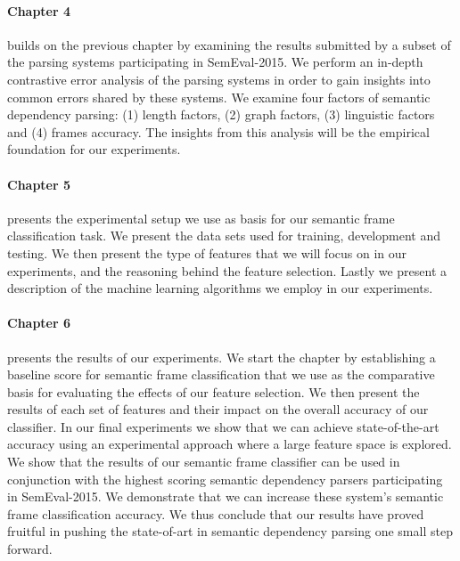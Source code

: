 \paragraph{Chapter 4} builds on the previous chapter by examining the results submitted by a subset of the parsing systems participating in SemEval-2015. We perform an in-depth contrastive error analysis of the parsing systems in order to gain insights into common errors shared by these systems. We examine four factors of semantic dependency parsing: (1) length factors, (2) graph factors, (3) linguistic factors and (4) frames accuracy. The insights from this analysis will be the empirical foundation for our experiments.

\paragraph{Chapter 5} presents the experimental setup we use as basis for our semantic frame classification task. We present the data sets used for training, development and testing. We then present the type of features that we will focus on in our experiments, and the reasoning behind the feature selection. Lastly we present a description of the machine learning algorithms we employ in our experiments.



\paragraph{Chapter 6} presents the results of our experiments. We start the chapter by establishing a baseline score for semantic frame classification that we use as the comparative basis for evaluating the effects of our feature selection. We then present the results of each set of features and their impact on the overall accuracy of our classifier. In our final experiments we show that we can achieve state-of-the-art accuracy using an experimental approach where a large feature space is explored. We show that the results of our semantic frame classifier can be used in conjunction with the highest scoring semantic dependency parsers participating in SemEval-2015. We demonstrate that we can increase these system's semantic frame classification accuracy. We thus conclude that our results have proved fruitful in pushing the state-of-art in semantic dependency parsing one small step forward.

